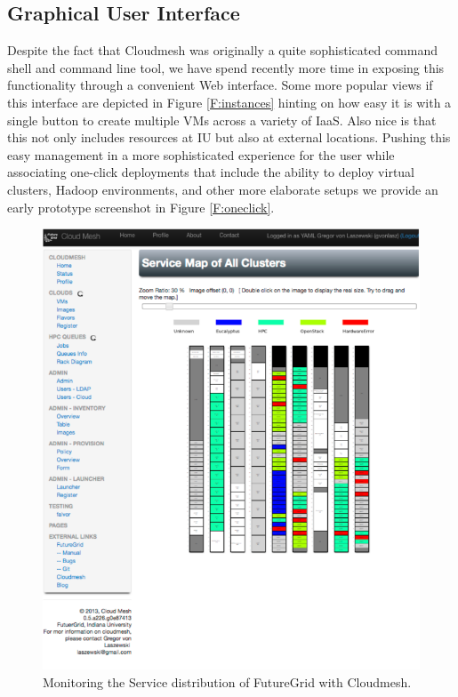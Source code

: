 \documentclass{article}
\begin{document}
{\subsection{Graphical User Interface}


Despite the fact that Cloudmesh was originally a quite sophisticated command shell and command line tool, we have spend recently more time in exposing this functionality through a convenient Web interface. Some more popular views if this interface are depicted in Figure \ref{F:instances} hinting on how easy it is with a single button to create multiple VMs across a variety of IaaS. Also nice is that this not only includes resources at IU but also at external locations. Pushing this easy management in a more sophisticated experience for the user while associating one-click deployments that include the ability to deploy virtual clusters, Hadoop environments, and other more elaborate setups we provide an early prototype screenshot in Figure \ref{F:oneclick}.


\begin{figure}[htb]
  \centering
    \includegraphics[width=.7\textwidth]{images/rainbow.pdf}
  \caption{Monitoring the Service distribution of FutureGrid with Cloudmesh.}
\end{figure}


}
\end{document}
